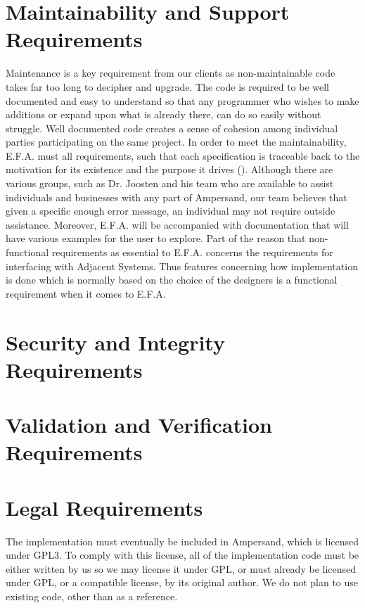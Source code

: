 \documentclass[12pt]{report}
\begin{document}
\section{Maintainability and Support Requirements}\label{sec:Support}
Maintenance is a key requirement from our clients as non-maintainable code takes far too long to 
decipher and upgrade. The code is required to be well documented and easy to understand so that any 
programmer who wishes to make additions or expand upon what is already there, can do so easily 
without struggle. Well documented code creates a sense of cohesion among individual parties 
participating on the same project. In order to meet the maintainability, E.F.A. must all 
requirements, such that each specification is traceable back to the motivation for its existence 
and the purpose it drives (\cite[2]{derFun}).
Although there are various groups, such as Dr. Joosten and his team who are available to assist 
individuals and businesses with any part of Ampersand, our team believes that given a specific 
enough error message, an individual may not require outside assistance. Moreover, E.F.A. will be 
accompanied with documentation that will have various examples for the user to explore. 
Part of the reason that non-functional requirements as essential to E.F.A. concerns the 
requirements for interfacing with Adjacent Systems. Thus features concerning how implementation is 
done which is normally based on the choice of the designers is a functional requirement when it 
comes to E.F.A. 
  

\section{Security and Integrity Requirements}\label{sec:Security}
\section{Validation and Verification Requirements}\label{sec:Cultural}
\section{Legal Requirements}\label{sec:Legal}
The implementation must eventually be included in Ampersand, which is licensed
under GPL3. To comply with this license, all of the implementation code must be
either written by us so we may license it under GPL, or must already be licensed
under GPL, or a compatible license, by its original author. We do not plan to
use existing code, other than as a reference.
%
%
\end{document}
